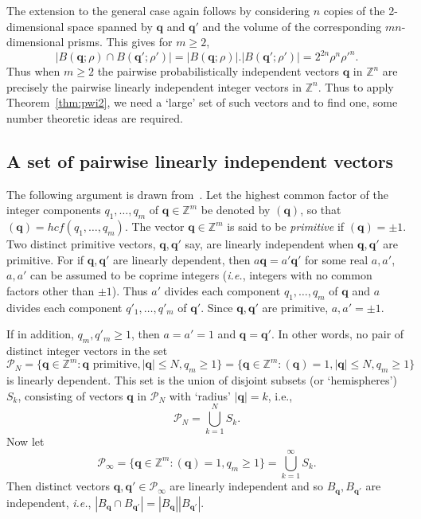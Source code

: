 \documentclass[reqno]{amsart}
\renewcommand{\ge}{\geqslant}
\renewcommand{\le}{\leqslant}
\newcommand{\Z}{{\mathbb{Z}}}
\newcommand{\0}{{\mathbf{0}}}
\newcommand{\q}{{\mathbf{q}}}
\newcommand{\col}{\colon}
\newcommand{\ie}{{\it{i.e.}}}
\newcommand{\cP}{\mathcal{P}}
\def\Bqbr{B(\q;\rho)}
\def\Bqbrp{B(\q';\rho')}
\begin{document}
The extension to the general case again follows by considering $n $ copies
of the 2-dimensional space spanned by $\q$ and $\q'$ and the volume of
the corresponding $mn$-dimensional prisms. This gives 
for $m\ge2$, %
\begin{equation*}
  \label{eq:Bindep}
|\Bqbr\cap \Bqbrp|  = |\Bqbr|.|\Bqbrp|
 = 2^{2n}\rho^n {\rho'}^n. 
\end{equation*}
Thus when $m\ge2$ the pairwise probabilistically independent vectors
$\q$ in $\Z^n$ are precisely the pairwise linearly independent integer
vectors in $\Z^n$.  Thus to apply Theorem~\ref{thm:pwi2}, we need a
`large' set of such vectors and to find one, some number theoretic
ideas are required.


\subsection{A set of pairwise linearly independent vectors} 
The following argument is drawn from~\cite{Sprindzuk}. Let the highest
common factor of the integer components $q_1,\dots, q_m$ of
$\q\in\Z^m$ be denoted by $(\q)$, so that$(\q)=hcf(q_1,\dots, q_m)$.
The vector $\q\in\Z^m$ is said to be {\em primitive} if $(\q)=\pm
1$. Two distinct primitive vectors, $\q,\q'$ say, are linearly
independent when $\q,\q'$ are primitive. For if $\q,\q'$ are linearly
dependent, then $a\q = a'\q' $ for some real $a, a'$, $a,a'$ can be
assumed to be coprime integers (\ie, integers with no common factors
other than $\pm 1$).  Thus $a'$ divides each component $q_1,\dots,q_m$
of $\q$ and $a$ divides each component $q'_1,\dots,q'_m$ of $\q'$.
Since $\q,\q'$ are primitive, $a, a' = \pm 1$.


If in addition, $q_m,q'_m \ge 1$, then $a = a' = 1$ and $\q = \q'$. In
other words, no pair of distinct integer vectors in the set
$$
\cP_N = \{\q \in \Z^m:\q {\text{ primitive}}, |\q| \le N, q_m \ge 1\}
 = \{\q \in \Z^m:(\q)=1, |\q| \le N, q_m \ge 1\}
$$
is linearly dependent.  This set is the union of disjoint subsets (or
`hemispheres') $S_k$, consisting of vectors $\q$ in $\cP_N$ with
`radius' $|\q| = k$, i.e.,
$$
\cP_N = \bigcup_{k=1}^N S_k.
$$
Now let 
$$
\cP_{\infty} = \{\q \in \Z^m\col (\q)=1, q_m \ge 1\} = 
\bigcup_{k=1}^{\infty} S_k.
$$
Then distinct vectors $\q, \q' \in \cP_{\infty}$ are linearly
independent and so  $B_\q, B_{\q'}$ are independent, \ie,
$|B_\q\cap B_{\q'}|=|B_\q| |B_{\q'}|$.
\end{document}

